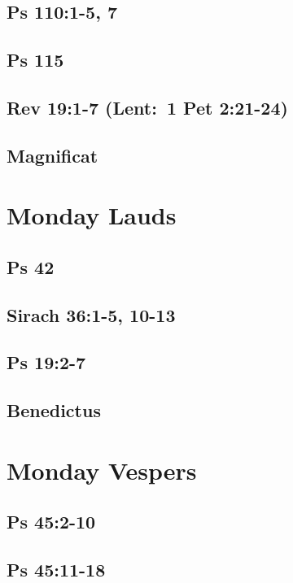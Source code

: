 \subsection{Ps 110:1-5, 7}

\subsection{Ps 115}

\subsection{Rev 19:1-7 (Lent: 1 Pet 2:21-24)}

\subsection{Magnificat}


\section{Monday Lauds}

\subsection{Ps 42}

\subsection{Sirach 36:1-5, 10-13}

\subsection{Ps 19:2-7}

\subsection{Benedictus}


\section{Monday Vespers}

\subsection{Ps 45:2-10}

\subsection{Ps 45:11-18}

